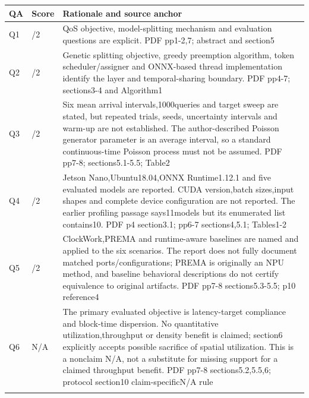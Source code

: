 \begin{longtable}{>{\raggedright\arraybackslash}p{}>{\raggedright\arraybackslash}p{}>{\raggedright\arraybackslash}p{}}
\toprule
\textbf{QA} & \textbf{Score} & \textbf{Rationale and source anchor}\\\midrule\endhead
Q1 & 2/2 & QoS objective,\allowbreak{} model-splitting mechanism and evaluation questions are explicit. PDF pp1-2,\allowbreak{}7;\allowbreak{} abstract and section5\\\addlinespace
Q2 & 2/2 & Genetic splitting objective,\allowbreak{} greedy preemption algorithm,\allowbreak{} token scheduler/assigner and ONNX-based thread implementation identify the layer and temporal-sharing boundary. PDF pp4-7;\allowbreak{} sections3-4 and Algorithm1\\\addlinespace
Q3 & 1/2 & Six mean arrival intervals,\allowbreak{}1000queries and target sweep are stated,\allowbreak{} but repeated trials,\allowbreak{} seeds,\allowbreak{} uncertainty intervals and warm-up are not established. The author-described Poisson generator parameter is an average interval,\allowbreak{} so a standard continuous-time Poisson process must not be assumed. PDF pp7-8;\allowbreak{} sections5.1-5.5;\allowbreak{} Table2\\\addlinespace
Q4 & 1/2 & Jetson Nano,\allowbreak{}Ubuntu18.04,\allowbreak{}ONNX Runtime1.12.1 and five evaluated models are reported. CUDA version,\allowbreak{}batch sizes,\allowbreak{}input shapes and complete device configuration are not reported. The earlier profiling passage says11models but its enumerated list contains10. PDF p4 section3.1;\allowbreak{} pp6-7 sections4,\allowbreak{}5.1;\allowbreak{} Tables1-2\\\addlinespace
Q5 & 1/2 & ClockWork,\allowbreak{}PREMA and runtime-aware baselines are named and applied to the six scenarios. The report does not fully document matched ports/configurations;\allowbreak{} PREMA is originally an NPU method,\allowbreak{} and baseline behavioral descriptions do not certify equivalence to original artifacts. PDF pp7-8 sections5.3-5.5;\allowbreak{} p10 reference4\\\addlinespace
Q6 & N/A & The primary evaluated objective is latency-target compliance and block-time dispersion. No quantitative utilization,\allowbreak{}throughput or density benefit is claimed;\allowbreak{} section6 explicitly accepts possible sacrifice of spatial utilization. This is a nonclaim N/A,\allowbreak{} not a substitute for missing support for a claimed throughput benefit. PDF pp7-8 sections5.2,\allowbreak{}5.5,\allowbreak{}6;\allowbreak{} protocol section10 claim-specificN/A rule\\\addlinespace

\end{longtable}
